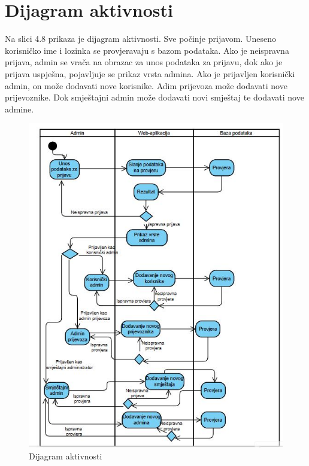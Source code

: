 			
			
			
			\eject 
		
		\section{Dijagram aktivnosti}

		{Na slici 4.8 prikaza je dijagram aktivnosti. Sve počinje prijavom. Uneseno korisničko ime i lozinka se provjeravaju s bazom podataka. Ako je neispravna prijava, admin se vrača na obrazac za unos podataka za prijavu, dok ako je prijava uspješna, pojavljuje se prikaz vrsta admina.
		Ako je prijavljen korisnički admin, on može dodavati nove korisnike. Adim prijevoza može dodavati nove prijevoznike. Dok smještajni admin može dodavati novi smještaj te dodavati nove admine.}
			
		\begin{figure}[H]
			\includegraphics[width=\linewidth]{slike/Dijagram aktivnsti.JPG}
			\centering
			\caption{Dijagram aktivnosti}
			\label{fig:Dijagram aktivnosti}
		\end{figure}


